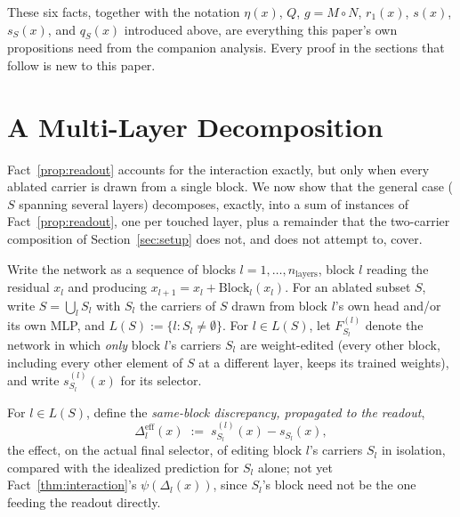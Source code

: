 \documentclass[11pt,a4paper]{article}
\begin{document}
These six facts, together with the notation $\eta(x)$, $Q$, $g=M\circ N$,
$r_1(x)$, $s(x)$, $s_S(x)$, and $q_S(x)$ introduced above, are everything
this paper's own propositions need from the companion analysis. Every proof
in the sections that follow is new to this paper.

\section{A Multi-Layer Decomposition}
\label{sec:multilayer}

Fact~\ref{prop:readout} accounts for the interaction exactly, but only when
every ablated carrier is drawn from a single block. We now show that the
general case ($S$ spanning several layers) decomposes, exactly, into a sum
of instances of Fact~\ref{prop:readout}, one per touched layer, plus a
remainder that the two-carrier composition of Section~\ref{sec:setup} does
not, and does not attempt to, cover.

Write the network as a sequence of blocks $l=1,\dots,n_{\mathrm{layers}}$,
block $l$ reading the residual $x_l$ and producing
$x_{l+1}=x_l+\mathrm{Block}_l(x_l)$. For an ablated subset $S$, write
$S=\bigcup_l S_l$ with $S_l$ the carriers of $S$ drawn from block $l$'s own
head and/or its own MLP, and $L(S):=\{l:S_l\ne\emptyset\}$. For $l\in L(S)$,
let $F_{S_l}^{(l)}$ denote the network in which \emph{only} block $l$'s
carriers $S_l$ are weight-edited (every other block, including every other
element of $S$ at a different layer, keeps its trained weights), and write
$s_{S_l}^{(l)}(x)$ for its selector.

For $l\in L(S)$, define the \emph{same-block discrepancy, propagated to the
readout},
\[
\Delta_l^{\mathrm{eff}}(x) \;:=\; s_{S_l}^{(l)}(x) - s_{S_l}(x),
\]
the effect, on the actual final selector, of editing block $l$'s carriers
$S_l$ in isolation, compared with the idealized prediction for $S_l$ alone;
not yet Fact~\ref{thm:interaction}'s $\psi(\Delta_l(x))$, since $S_l$'s
block need not be the one feeding the readout directly.
\end{document}
